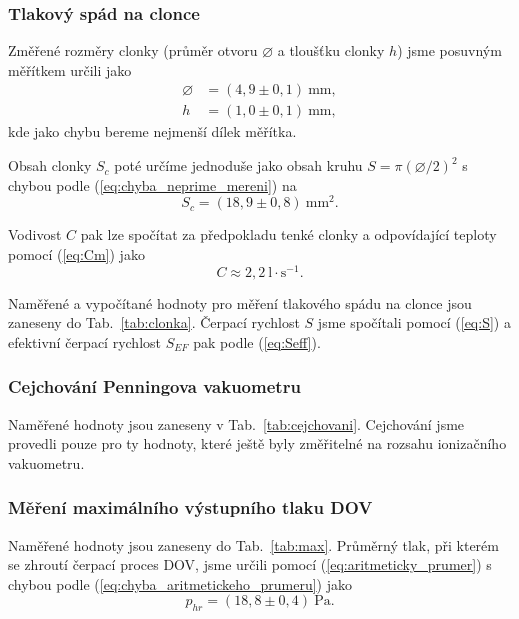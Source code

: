 \documentclass[english]{article}
\newcommand{\unit}[1]{~\mathrm{#1}}
\begin{document}
	\subsubsection{Tlakový spád na clonce}
		Změřené rozměry clonky (průměr otvoru $\diameter$ a tloušťku clonky $h$) jsme posuvným měřítkem určili jako 
		\begin{equation}
			\begin{aligned}
				\diameter &= (4,9\pm0,1)\unit{mm},\\
				        h &= (1,0\pm0,1)\unit{mm},
			\end{aligned}
		\end{equation}
		kde jako chybu bereme nejmenší dílek měřítka.
		
		Obsah clonky $S_c$ poté určíme jednoduše jako obsah kruhu $S=\pi (\diameter/2)^2$ s chybou podle (\ref{eq:chyba_neprime_mereni}) na
		\begin{equation}
			S_c = (18,9 \pm 0,8)\unit{mm^2}.
		\end{equation}
		
		Vodivost $C$ pak lze spočítat za předpokladu tenké clonky a odpovídající teploty pomocí (\ref{eq:Cm}) jako
		\begin{equation}
			C \approx 2,2\unit{l\cdot s^{-1}}.
		\end{equation}
		
		Naměřené a vypočítané hodnoty pro měření tlakového spádu na clonce jsou zaneseny do Tab.~\ref{tab:clonka}. Čerpací rychlost $S$ jsme spočítali pomocí (\ref{eq:S}) a  efektivní čerpací rychlost $S_{EF}$ pak podle (\ref{eq:Seff}).
	
	\subsubsection{Cejchování Penningova vakuometru}
		Naměřené hodnoty jsou zaneseny v Tab.~\ref{tab:cejchovani}. Cejchování jsme provedli pouze pro ty hodnoty, které ještě byly změřitelné na rozsahu ionizačního vakuometru. 

	\subsubsection{Měření maximálního výstupního tlaku DOV}
		Naměřené hodnoty jsou zaneseny do Tab.~\ref{tab:max}. Průměrný tlak, při kterém se zhroutí čerpací proces DOV, jsme určili pomocí (\ref{eq:aritmeticky_prumer}) s chybou podle (\ref{eq:chyba_aritmetickeho_prumeru}) jako
		\begin{equation}
			p_{hr} = (18,8\pm0,4)\unit{Pa}.
			\label{eq:phr}
		\end{equation}
			
\end{document}
